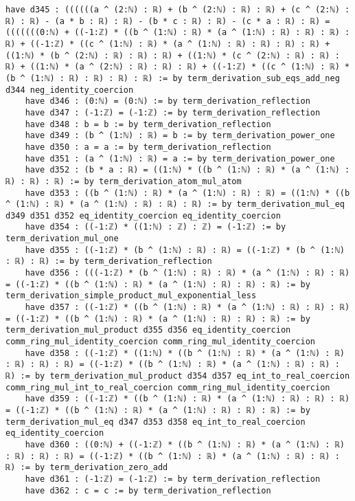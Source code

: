 \documentclass{article}
\begin{document}
\begin{tcolorbox}[colback=white!10, width=\linewidth]
\begin{lstlisting}[language=Lean4]
    have d345 : ((((((a ^ (2:ℕ) : ℝ) + (b ^ (2:ℕ) : ℝ) : ℝ) + (c ^ (2:ℕ) : ℝ) : ℝ) - (a * b : ℝ) : ℝ) - (b * c : ℝ) : ℝ) - (c * a : ℝ) : ℝ) = (((((((0:ℕ) + ((-1:ℤ) * ((b ^ (1:ℕ) : ℝ) * (a ^ (1:ℕ) : ℝ) : ℝ) : ℝ) : ℝ) + ((-1:ℤ) * ((c ^ (1:ℕ) : ℝ) * (a ^ (1:ℕ) : ℝ) : ℝ) : ℝ) : ℝ) + ((1:ℕ) * (b ^ (2:ℕ) : ℝ) : ℝ) : ℝ) + ((1:ℕ) * (c ^ (2:ℕ) : ℝ) : ℝ) : ℝ) + ((1:ℕ) * (a ^ (2:ℕ) : ℝ) : ℝ) : ℝ) + ((-1:ℤ) * ((c ^ (1:ℕ) : ℝ) * (b ^ (1:ℕ) : ℝ) : ℝ) : ℝ) : ℝ) := by term_derivation_sub_eqs_add_neg d344 neg_identity_coercion
    have d346 : (0:ℕ) = (0:ℕ) := by term_derivation_reflection
    have d347 : (-1:ℤ) = (-1:ℤ) := by term_derivation_reflection
    have d348 : b = b := by term_derivation_reflection
    have d349 : (b ^ (1:ℕ) : ℝ) = b := by term_derivation_power_one
    have d350 : a = a := by term_derivation_reflection
    have d351 : (a ^ (1:ℕ) : ℝ) = a := by term_derivation_power_one
    have d352 : (b * a : ℝ) = ((1:ℕ) * ((b ^ (1:ℕ) : ℝ) * (a ^ (1:ℕ) : ℝ) : ℝ) : ℝ) := by term_derivation_atom_mul_atom
    have d353 : ((b ^ (1:ℕ) : ℝ) * (a ^ (1:ℕ) : ℝ) : ℝ) = ((1:ℕ) * ((b ^ (1:ℕ) : ℝ) * (a ^ (1:ℕ) : ℝ) : ℝ) : ℝ) := by term_derivation_mul_eq d349 d351 d352 eq_identity_coercion eq_identity_coercion
    have d354 : ((-1:ℤ) * ((1:ℕ) : ℤ) : ℤ) = (-1:ℤ) := by term_derivation_mul_one
    have d355 : ((-1:ℤ) * (b ^ (1:ℕ) : ℝ) : ℝ) = ((-1:ℤ) * (b ^ (1:ℕ) : ℝ) : ℝ) := by term_derivation_reflection
    have d356 : (((-1:ℤ) * (b ^ (1:ℕ) : ℝ) : ℝ) * (a ^ (1:ℕ) : ℝ) : ℝ) = ((-1:ℤ) * ((b ^ (1:ℕ) : ℝ) * (a ^ (1:ℕ) : ℝ) : ℝ) : ℝ) := by term_derivation_simple_product_mul_exponential_less
    have d357 : ((-1:ℤ) * ((b ^ (1:ℕ) : ℝ) * (a ^ (1:ℕ) : ℝ) : ℝ) : ℝ) = ((-1:ℤ) * ((b ^ (1:ℕ) : ℝ) * (a ^ (1:ℕ) : ℝ) : ℝ) : ℝ) := by term_derivation_mul_product d355 d356 eq_identity_coercion comm_ring_mul_identity_coercion comm_ring_mul_identity_coercion
    have d358 : ((-1:ℤ) * ((1:ℕ) * ((b ^ (1:ℕ) : ℝ) * (a ^ (1:ℕ) : ℝ) : ℝ) : ℝ) : ℝ) = ((-1:ℤ) * ((b ^ (1:ℕ) : ℝ) * (a ^ (1:ℕ) : ℝ) : ℝ) : ℝ) := by term_derivation_mul_product d354 d357 eq_int_to_real_coercion comm_ring_mul_int_to_real_coercion comm_ring_mul_identity_coercion
    have d359 : ((-1:ℤ) * ((b ^ (1:ℕ) : ℝ) * (a ^ (1:ℕ) : ℝ) : ℝ) : ℝ) = ((-1:ℤ) * ((b ^ (1:ℕ) : ℝ) * (a ^ (1:ℕ) : ℝ) : ℝ) : ℝ) := by term_derivation_mul_eq d347 d353 d358 eq_int_to_real_coercion eq_identity_coercion
    have d360 : ((0:ℕ) + ((-1:ℤ) * ((b ^ (1:ℕ) : ℝ) * (a ^ (1:ℕ) : ℝ) : ℝ) : ℝ) : ℝ) = ((-1:ℤ) * ((b ^ (1:ℕ) : ℝ) * (a ^ (1:ℕ) : ℝ) : ℝ) : ℝ) := by term_derivation_zero_add
    have d361 : (-1:ℤ) = (-1:ℤ) := by term_derivation_reflection
    have d362 : c = c := by term_derivation_reflection

\end{lstlisting}
\end{tcolorbox}
\end{document}
